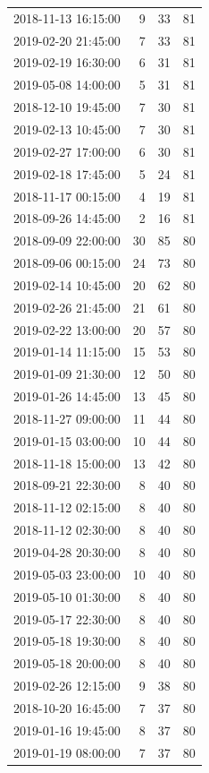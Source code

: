 \begin{tabular}{lrrr}
2018-11-13 16:15:00 & 9 & 33 & 81 \\
2019-02-20 21:45:00 & 7 & 33 & 81 \\
2019-02-19 16:30:00 & 6 & 31 & 81 \\
2019-05-08 14:00:00 & 5 & 31 & 81 \\
2018-12-10 19:45:00 & 7 & 30 & 81 \\
2019-02-13 10:45:00 & 7 & 30 & 81 \\
2019-02-27 17:00:00 & 6 & 30 & 81 \\
2019-02-18 17:45:00 & 5 & 24 & 81 \\
2018-11-17 00:15:00 & 4 & 19 & 81 \\
2018-09-26 14:45:00 & 2 & 16 & 81 \\
2018-09-09 22:00:00 & 30 & 85 & 80 \\
2018-09-06 00:15:00 & 24 & 73 & 80 \\
2019-02-14 10:45:00 & 20 & 62 & 80 \\
2019-02-26 21:45:00 & 21 & 61 & 80 \\
2019-02-22 13:00:00 & 20 & 57 & 80 \\
2019-01-14 11:15:00 & 15 & 53 & 80 \\
2019-01-09 21:30:00 & 12 & 50 & 80 \\
2019-01-26 14:45:00 & 13 & 45 & 80 \\
2018-11-27 09:00:00 & 11 & 44 & 80 \\
2019-01-15 03:00:00 & 10 & 44 & 80 \\
2018-11-18 15:00:00 & 13 & 42 & 80 \\
2018-09-21 22:30:00 & 8 & 40 & 80 \\
2018-11-12 02:15:00 & 8 & 40 & 80 \\
2018-11-12 02:30:00 & 8 & 40 & 80 \\
2019-04-28 20:30:00 & 8 & 40 & 80 \\
2019-05-03 23:00:00 & 10 & 40 & 80 \\
2019-05-10 01:30:00 & 8 & 40 & 80 \\
2019-05-17 22:30:00 & 8 & 40 & 80 \\
2019-05-18 19:30:00 & 8 & 40 & 80 \\
2019-05-18 20:00:00 & 8 & 40 & 80 \\
2019-02-26 12:15:00 & 9 & 38 & 80 \\
2018-10-20 16:45:00 & 7 & 37 & 80 \\
2019-01-16 19:45:00 & 8 & 37 & 80 \\
2019-01-19 08:00:00 & 7 & 37 & 80 \\

\end{tabular}
